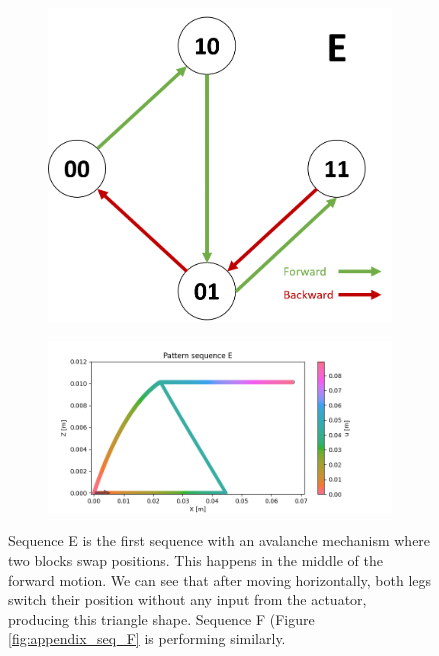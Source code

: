         \begin{figure}[h]
            \centering
            \begin{subfigure}{.2\textwidth}
            \includegraphics[width=\textwidth]{images/S_E.png}
            \end{subfigure}%
            \begin{subfigure}{.6\textwidth}
            \includegraphics[width=\textwidth]{images/E.png}
            \end{subfigure}
            \caption{Sequence E is the first sequence with an avalanche mechanism where two blocks swap positions. This happens in the middle of the forward motion. We can see that after moving horizontally, both legs switch their position without any input from the actuator, producing this triangle shape. Sequence F (Figure \ref{fig:appendix_seq_F} is performing similarly.}
        \end{figure}
        
